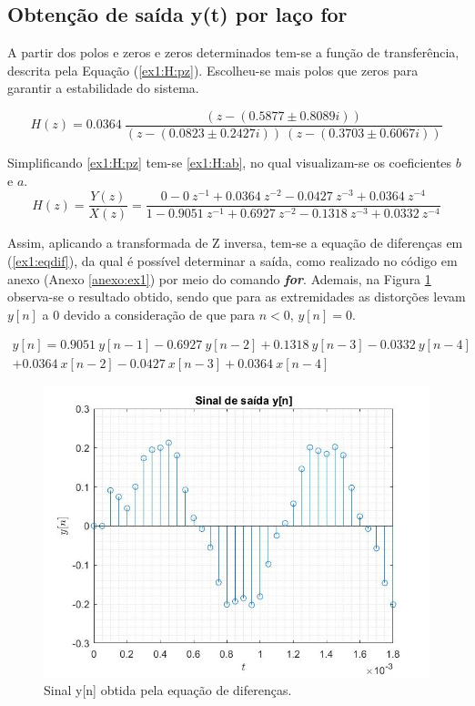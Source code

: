 \documentclass[a4paper,12pt,oneside,openany,table,xcdraw]{article}
\begin{document}
\subsection{Obtenção de saída y(t) por laço for}
A partir dos polos e zeros e zeros determinados tem-se a função de transferência, descrita pela Equação (\ref{ex1:H:pz}). Escolheu-se mais polos que zeros para garantir a estabilidade do sistema.

\begin{equation} \label{ex1:H:pz}
H(z) = 0.0364\  \dfrac{ (z - (0.5877 \pm 0.8089i) )}{(z - (0.0823 \pm 0.2427i))\ (z - (0.3703 \pm 0.6067i))}
\end{equation}
\vspace{0.1cm}

Simplificando \ref{ex1:H:pz} tem-se \ref{ex1:H:ab}, no qual visualizam-se os coeficientes $b$ e $a$.
\begin{equation} \label{ex1:H:ab}
H(z) = \dfrac{Y(z)}{X(z)}=\dfrac{0 - 0\ z^{-1} + 0.0364\ z^{-2} -0.0427\ z^{-3} + 0.0364\ z^{-4}}{1 -0.9051\ z^{-1} +0.6927\ z^{-2} -0.1318\ z^{-3} +0.0332\ z^{-4}}
\end{equation}
\vspace{0.2cm}

Assim, aplicando a transformada de Z inversa, tem-se a equação de diferenças em (\ref{ex1:eqdif}), da qual é possível determinar a saída, como realizado no código em anexo (Anexo \ref{anexo:ex1}) por meio do comando \textbf{\emph{for}}. Ademais, na Figura \ref{ex1:yn} observa-se o resultado obtido, sendo que para as extremidades as distorções levam $y[n]$ a 0 devido a consideração de que para $n<0$, $y[n]=0$.

\begin{multline} \label{ex1:eqdif}
y[n] = 0.9051\ y[n-1] - 0.6927 \ y[n-2]  +0.1318\ y[n-3]  - 0.0332\ y[n-4] \\
+ 0.0364\ x[n-2]   -0.0427\ x[n-3]  +  0.0364\ x[n-4]
\end{multline}

\vspace{0.2cm}
\begin{figure}[H]
\centering
\includegraphics[width=14cm]{ex1_yn}
\caption{Sinal y[n] obtida pela equação de diferenças.}
\label{ex1:yn}
\end{figure}
\end{document}
